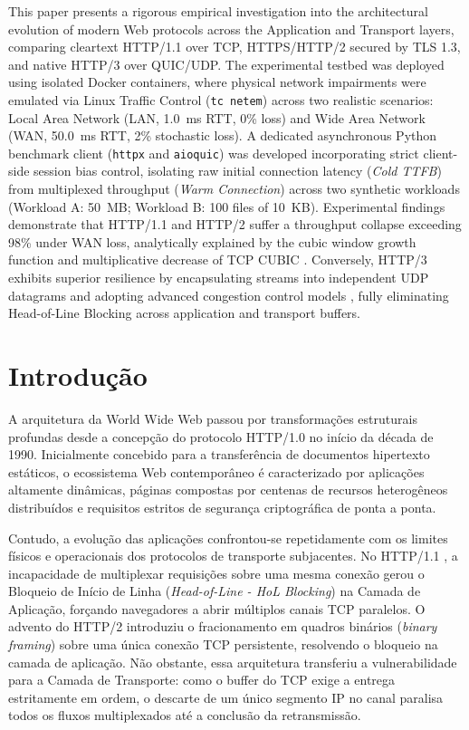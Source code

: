 \documentclass[12pt]{article}
\begin{document}
\begin{englishabstract}
This paper presents a rigorous empirical investigation into the architectural evolution of modern Web protocols across the Application and Transport layers, comparing cleartext HTTP/1.1 over TCP, HTTPS/HTTP/2 secured by TLS 1.3, and native HTTP/3 over QUIC/UDP. The experimental testbed was deployed using isolated Docker containers, where physical network impairments were emulated via Linux Traffic Control (\texttt{tc netem}) across two realistic scenarios: Local Area Network (LAN, 1.0~ms RTT, 0\% loss) and Wide Area Network (WAN, 50.0~ms RTT, 2\% stochastic loss). A dedicated asynchronous Python benchmark client (\texttt{httpx} and \texttt{aioquic}) was developed incorporating strict client-side session bias control, isolating raw initial connection latency (\textit{Cold TTFB}) from multiplexed throughput (\textit{Warm Connection}) across two synthetic workloads (Workload A: 50~MB; Workload B: 100 files of 10~KB). Experimental findings demonstrate that HTTP/1.1 and HTTP/2 suffer a throughput collapse exceeding 98\% under WAN loss, analytically explained by the cubic window growth function and multiplicative decrease of TCP CUBIC \cite{tanenbaum2021}. Conversely, HTTP/3 exhibits superior resilience by encapsulating streams into independent UDP datagrams and adopting advanced congestion control models \cite{tanenbaum2021}, fully eliminating Head-of-Line Blocking across application and transport buffers.
\end{englishabstract}

\section{Introdução}

A arquitetura da World Wide Web passou por transformações estruturais profundas desde a concepção do protocolo HTTP/1.0 no início da década de 1990. Inicialmente concebido para a transferência de documentos hipertexto estáticos, o ecossistema Web contemporâneo é caracterizado por aplicações altamente dinâmicas, páginas compostas por centenas de recursos heterogêneos distribuídos e requisitos estritos de segurança criptográfica de ponta a ponta.

Contudo, a evolução das aplicações confrontou-se repetidamente com os limites físicos e operacionais dos protocolos de transporte subjacentes. No HTTP/1.1 \cite{rfc793}, a incapacidade de multiplexar requisições sobre uma mesma conexão gerou o Bloqueio de Início de Linha (\textit{Head-of-Line - HoL Blocking}) na Camada de Aplicação, forçando navegadores a abrir múltiplos canais TCP paralelos. O advento do HTTP/2 \cite{rfc7540} introduziu o fracionamento em quadros binários (\textit{binary framing}) sobre uma única conexão TCP persistente, resolvendo o bloqueio na camada de aplicação. Não obstante, essa arquitetura transferiu a vulnerabilidade para a Camada de Transporte: como o buffer do TCP exige a entrega estritamente em ordem, o descarte de um único segmento IP no canal paralisa todos os fluxos multiplexados até a conclusão da retransmissão.
\end{document}
